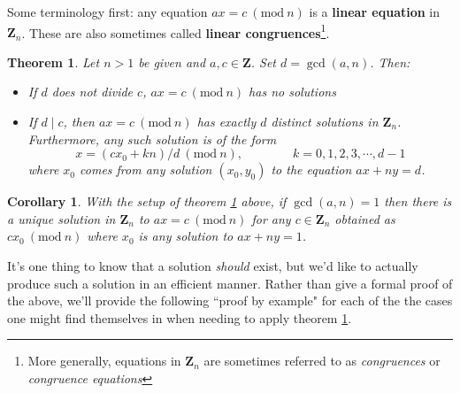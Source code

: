 \documentclass[12pt]{article}
\numberwithin{equation}{subsection}
\newtheorem{thm}[subsection]{Theorem}
\newtheorem{corollary}[subsection]{Corollary}
\theoremstyle{note}
\newcommand{\Mod}[1]{\ (\mathrm{mod}\ #1)}
\begin{document}
Some terminology first: any equation $ax=c\Mod{n}$ is a \textbf{linear equation} in $\mathbf{Z}_n$. These are also sometimes called \textbf{linear congruences}\footnote{More generally, equations in $\mathbf{Z}_n$ are sometimes referred to as \textit{congruences} or \textit{congruence equations}}.


\begin{thm}\label{lin-cong}
	Let $n>1$ be given and $a,c\in\mathbf{Z}$. Set $d=\gcd(a,n)$. Then:
	\begin{itemize}
		\item If $d$ does not divide $c$, $ax=c\Mod{n}$ has no solutions
		\item If $d\mid c$, then $ax=c\Mod{n}$ has exactly $d$ distinct solutions in $\mathbf{Z}_n$. Furthermore, any such solution is of the form \begin{equation} \label{lin-cong-solutions} x=(cx_0+kn)/d \Mod{n}, \qquad \qquad k=0,1,2,3,\cdots,d-1\end{equation} where $x_0$ comes from any solution $(x_0,y_0)$ to the equation $ax+ny=d$.
	\end{itemize}
\end{thm}

\begin{corollary}
	With the setup of theorem \ref{lin-cong} above, if $\gcd(a,n)=1$ then there is a unique solution in $\mathbf{Z}_n$ to $ax=c\Mod{n}$ for any $c\in \mathbf{Z}_n$ obtained as $cx_0\Mod{n}$ where $x_0$ is any solution to $ax+ny=1$. 
\end{corollary}
It's one thing to know that a solution \textit{should} exist, but we'd like to actually produce such a solution in an efficient manner. Rather than give a formal proof of the above, we'll provide the following ``proof by example" for each of the the cases one might find themselves in when needing to apply theorem \ref{lin-cong}.
\end{document}
